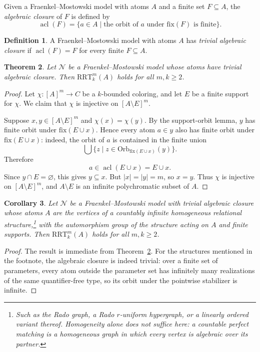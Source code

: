 \documentclass[10pt,a4paper]{amsart}
\newtheorem{theorem}{Theorem}[section]
\newtheorem{corollary}[theorem]{Corollary}
\theoremstyle{definition}
\newtheorem{definition}[theorem]{Definition}
\DeclareMathOperator{\acl}{acl}
\newcommand{\RRT}{\mathrm{RRT}}
\newcommand{\NN}{\mathcal{N}}
\begin{document}
Given a Fraenkel--Mostowski model with atoms \(A\) and a finite set \(F\subseteq A\), the \emph{algebraic closure} of \(F\) is defined by
\[
    \acl(F)=\{a\in A\mid \text{the orbit of }a\text{ under }\mathrm{fix}(F)\text{ is finite}\}.
\]

\begin{definition}\label{def:tac}
A Fraenkel--Mostowski model with atoms \(A\) has \emph{trivial algebraic closure} if \(\acl(F)=F\) for every finite \(F\subseteq A\).
\end{definition}

\begin{theorem}\label{thm:tac}
Let \(\NN\) be a Fraenkel--Mostowski model whose atoms have trivial algebraic closure.  Then \(\RRT^m_k(A)\) holds for all \(m,k\geq 2\).
\end{theorem}

\begin{proof}
Let \(\chi:[A]^m\to C\) be a \(k\)-bounded coloring, and let \(E\) be a finite support for \(\chi\).  We claim that \(\chi\) is injective on \([A\setminus E]^m\).

Suppose \(x,y\in[A\setminus E]^m\) and \(\chi(x)=\chi(y)\).  By the support-orbit lemma, \(y\) has finite orbit under \(\mathrm{fix}(E\cup x)\).  Hence every atom \(a\in y\) also has finite orbit under \(\mathrm{fix}(E\cup x)\): indeed, the orbit of \(a\) is contained in the finite union
\[
    \bigcup\{z\mid z\in \mathrm{Orb}_{\mathrm{fix}(E\cup x)}(y)\}.
\]
Therefore
\[
    a\in\acl(E\cup x)=E\cup x.
\]
Since \(y\cap E=\varnothing\), this gives \(y\subseteq x\).  But \(|x|=|y|=m\), so \(x=y\).  Thus \(\chi\) is injective on \([A\setminus E]^m\), and \(A\setminus E\) is an infinite polychromatic subset of \(A\).
\end{proof}

\begin{corollary}
Let \(\NN\) be a Fraenkel--Mostowski model with trivial algebraic closure whose atoms \(A\) are the vertices of a countably infinite homogeneous relational structure,\footnote{Such as the Rado graph, a Rado \(r\)-uniform hypergraph, or a linearly ordered variant thereof.  Homogeneity alone does not suffice here: a countable perfect matching is a homogeneous graph in which every vertex is algebraic over its partner.} with the automorphism group of the structure acting on \(A\) and finite supports.  Then \(\RRT^m_k(A)\) holds for all \(m,k\geq 2\).
\end{corollary}

\begin{proof}
The result is immediate from Theorem~\ref{thm:tac}.  For the structures mentioned in the footnote, the algebraic closure is indeed trivial: over a finite set of parameters, every atom outside the parameter set has infinitely many realizations of the same quantifier-free type, so its orbit under the pointwise stabilizer is infinite.
\end{proof}
\end{document}
